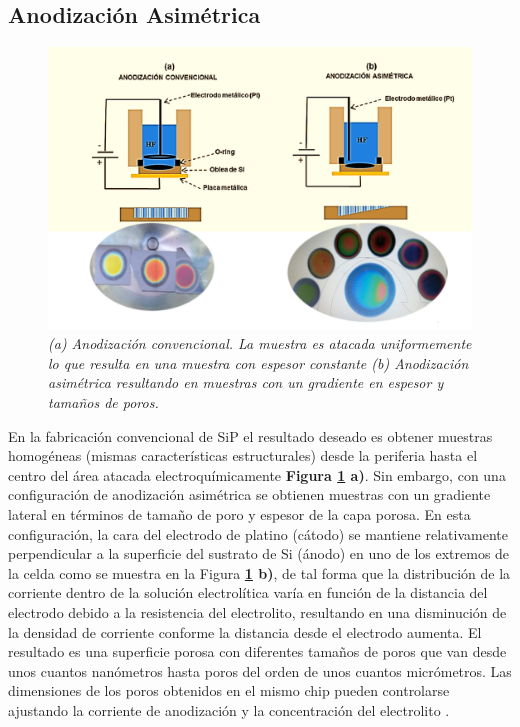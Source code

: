 \documentclass[a4paper,11pt,]{book}
\begin{document}
\subsection{Anodización Asimétrica }
\begin{figure}[H]
	\centering
	\includegraphics[scale=.4]{../Images/an}
	\caption{\emph{(a) Anodización convencional. La muestra es atacada uniformemente lo que resulta en una muestra con espesor constante (b) Anodización asimétrica resultando en muestras con un gradiente en espesor y tamaños de poros.}}
	\label{fig:CPAA}
\end{figure}
En la fabricación convencional de SiP el resultado deseado es obtener muestras homogéneas (mismas características estructurales) desde la periferia hasta el centro del área atacada electroquímicamente \textbf{Figura \ref{fig:CPAA} a)}. Sin embargo, con una configuración de anodización asimétrica se obtienen muestras con un gradiente lateral en términos de tamaño de poro y espesor de la capa porosa. En esta configuración, la cara del electrodo de platino (cátodo) se mantiene relativamente perpendicular a la superficie del sustrato de Si (ánodo) en uno de los extremos de la celda como se muestra en la Figura \textbf{\ref{fig:CPAA} b)}, de tal forma que la distribución de la corriente dentro de la solución electrolítica varía en función de la distancia del electrodo debido a la resistencia del electrolito, resultando en una disminución de la densidad de corriente conforme la distancia desde el electrodo aumenta. El resultado es una superficie porosa con diferentes tamaños de poros que van desde unos cuantos nanómetros hasta poros del orden de unos cuantos micrómetros. Las dimensiones de los poros obtenidos en el mismo chip pueden controlarse ajustando la corriente de anodización y la concentración del electrolito .
\end{document}
